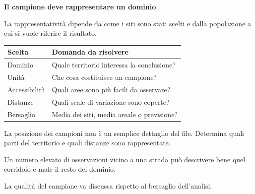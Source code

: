 \documentclass[12pt,aspectratio=1610]{beamer}
\newcommand{\PBody}[1]{\par{\fontsize{11.3}{14.8}\selectfont #1\par}}
\newcommand{\PSmall}[1]{\par{\fontsize{9.8}{13.1}\selectfont #1\par}}
\newcommand{\PInfo}[1]{%
\begin{tcolorbox}[enhanced,arc=1.6mm,boxrule=.55pt,colback=GeoTint,
 colframe=Rule!80!Classical,left=2.3mm,right=2.3mm,top=2mm,bottom=2mm,
 before skip=1mm,after skip=1mm]
\PSmall{#1}\end{tcolorbox}}
\begin{document}
\begin{frame}[plain]\hypertarget{slide82}{}
\begin{lrbox}{\TitleBox}
\begin{minipage}[t]{17.7cm}\raggedright\color{Ink}\fontsize{11.3}{14.8}\selectfont
\color{Navy}\bfseries\fontsize{20.6}{24.5}\selectfont Il campione deve rappresentare un dominio
\end{minipage}\end{lrbox}

\begin{lrbox}{\RecallBox}
\begin{minipage}[t]{14.3cm}\raggedright\color{Ink}\fontsize{11.3}{14.8}\selectfont
\fontsize{10.3}{13.8}\selectfont La rappresentatività dipende da come i siti sono stati scelti e dalla popolazione a cui si vuole riferire il risultato.
\end{minipage}\end{lrbox}

\begin{lrbox}{\PilotLeftBox}
\begin{minipage}[t]{10.05cm}\raggedright\color{Ink}\fontsize{11.3}{14.8}\selectfont
{\fontsize{10.2}{13.1}\selectfont\renewcommand{\arraystretch}{1.45}\begin{tabular}{@{}p{3.2cm}p{5.8cm}@{}}\toprule
\textbf{Scelta} & \textbf{Domanda da risolvere}\\\midrule
Dominio & Quale territorio interessa la conclusione?\\
Unità & Che cosa costituisce un campione?\\
Accessibilità & Quali aree sono più facili da osservare?\\
Distanze & Quali scale di variazione sono coperte?\\
Bersaglio & Media dei siti, media areale o previsione?\\
\bottomrule\end{tabular}}

\end{minipage}\end{lrbox}

\begin{lrbox}{\PilotRightBox}
\begin{minipage}[t]{7.55cm}\raggedright\color{Ink}\fontsize{11.3}{14.8}\selectfont
\PBody{La posizione dei campioni non è un semplice dettaglio del file. Determina quali parti del territorio e quali distanze sono rappresentate.}
\vspace{2.5mm}
\PInfo{Un numero elevato di osservazioni vicino a una strada può descrivere bene quel corridoio e male il resto del dominio.}
\PBody{La qualità del campione va discussa rispetto al bersaglio dell’analisi.}
\vspace{2.5mm}


\end{minipage}
\end{lrbox}
\end{frame}
\end{document}
